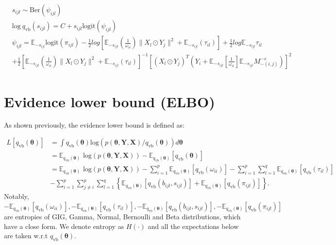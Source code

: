 \documentclass[
]{book}
\begin{document}
\begin{equation*}
\begin{split}
& s_{ijl} \sim \text{Ber}(\psi_{ijl}) \\
& \text{log} \ q_{\text{vb}}(s_{ijl}) = C + s_{ijl}\text{logit}(\psi_{ijl}) \\
& \psi_{ijl} = \mathbb{E}_{-s_{ijl}} \text{logit}(\pi_{ijl}) - \frac{1}{2}log\left[
\mathbb{E}_{-s_{ijl}}(\frac{1}{\omega_{ii}})\|X_l \odot Y_j\|^2 + \mathbb{E}_{-s_{ijl}}(\tau_{il}) \right] + \frac{1}{2}log \mathbb{E}_{-s_{ijl}} \tau_{il} \\
&+ \frac{1}{2}\left[
\mathbb{E}_{-s_{ijl}}(\frac{1}{\omega_{ii}})\|X_l \odot Y_j\|^2 + \mathbb{E}_{-s_{ijl}}(\tau_{il}) \right]^{-1}\left[
(X_l \odot Y_j)^T (Y_i + \mathbb{E}_{-s_{ijl}}\left[\frac{1}{\omega_{ii}}\right] \mathbb{E}_{-s_{ijl}} M_{-(i,j)}^{-s})
\right]^2 \\
\end{split}
\end{equation*}

\hypertarget{GraphElbo}{%
\section{Evidence lower bound (ELBO)}\label{GraphElbo}}

As shown previously, the evidence lower bound is defined as:

\begin{equation*}
\begin{split}
L[q_{\text{vb}}(\boldsymbol{\theta})] &= \int q_{\text{vb}}(\boldsymbol{\theta}) \text{log} \left ( p(\boldsymbol{\theta,Y,X}) / q_{\text{vb}}(\boldsymbol{\theta}) \right)d\boldsymbol{\theta} \\
& = \mathbb{E}_{q_{\text{vb}}(\boldsymbol{\theta})}
\text{ log}(p(\boldsymbol{\theta,Y,X})) 
- \mathbb{E}_{q_{\text{vb}}(\boldsymbol{\theta})} [q_{\text{vb}}(\boldsymbol{\theta})] \\
& = \mathbb{E}_{q_{\text{vb}}(\boldsymbol{\theta})}
\text{ log}(p(\boldsymbol{\theta,Y,X})) 
- \sum_{i=1}^p \mathbb{E}_{q_{\text{vb}}(\boldsymbol{\theta})} [q_{\text{vb}}(\omega_{ii})]
- \sum_{i=1}^p \sum_{l=1}^q \mathbb{E}_{q_{\text{vb}}(\boldsymbol{\theta})} [q_{\text{vb}}(\tau_{il})] \\
& - \sum_{i=1}^p \sum_{j \neq i}^p \sum_{l=1}^q 
\left\{
\mathbb{E}_{q_{\text{vb}}(\boldsymbol{\theta})} [q_{\text{vb}}(b_{ijl},s_{ijl})] + 
\mathbb{E}_{q_{\text{vb}}(\boldsymbol{\theta})} [q_{\text{vb}}(\pi_{ijl})]
\right\}.
\end{split}
\end{equation*}
Notably, \(-\mathbb{E}_{q_{\text{vb}}(\boldsymbol{\theta})} [q_{\text{vb}}(\omega_{ii})] , -\mathbb{E}_{q_{\text{vb}}(\boldsymbol{\theta})} [q_{\text{vb}}(\tau_{il})], -\mathbb{E}_{q_{\text{vb}}(\boldsymbol{\theta})} [q_{\text{vb}}(b_{ijl},s_{ijl})], -\mathbb{E}_{q_{\text{vb}}(\boldsymbol{\theta})} [q_{\text{vb}}(\pi_{ijl})]\) are entropies of GIG, Gamma, Normal, Bernoulli and Beta distributions, which have a close form. We denote entropy as \(H(\cdot)\) and all the expectations below are taken w.r.t \(q_{\text{vb}}(\boldsymbol{\theta})\).
\end{document}
